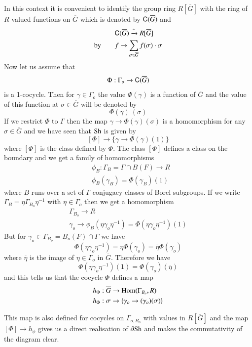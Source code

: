 In this context it is convenient to identify the group ring $R[\overline{G}]$ with the ring of $R$ valued functions on $\overline{G}$ which is denoted by $\mathsf{C}(\overline{G})$ and
\begin{align*}
& \mathsf{C}(\overline{G})\xrightarrow{\sim}R[\overline{G}]\\
\text{by}\qquad & f\to \sum\limits_{\sigma\in \overline{G}}f(\sigma)\cdot \sigma
\end{align*}
Now let us assume that
$$
\Phi :\Gamma_{o}\to \mathsf{C}(\overline{G})
$$
is a 1-cocycle. Then for $\gamma\in \Gamma_{o}$ the value $\Phi(\gamma)$ is a function of $\overline{G}$ and the value of this function at $\sigma\in \overline{G}$ will be denoted by
$$
\Phi(\gamma) \ (\sigma)
$$
If we restrict $\Phi$ to $\Gamma$ then the map $\gamma\to \Phi(\gamma)(\sigma)$ is a homomorphism for any\pageoriginale $\sigma\in\overline{G}$ and we have seen that $\mathrm{Sh}$ is given by
$$
[\Phi]\to \{\gamma\to \Phi(\gamma)(1)\}
$$
where $[\Phi]$ is the class defined by $\Phi$. The class $[\Phi]$ defines a class on the boundary and we get a family of homomorphisms
\begin{align*}
& \phi_{B}:\Gamma_{B}=\Gamma\cap B(F)\to R\\
& \phi_{B}(\gamma_{B})=\Phi(\gamma_{B})(1)
\end{align*}
where $B$ runs over a set of $\Gamma$ conjugacy classes of Borel subgroups. If we write $\Gamma_{B}=\eta\Gamma_{B_{o}}\eta^{-1}$ with $\eta\in \Gamma_{o}$ then we get a homomorphism
\begin{gather*}
\Gamma_{B_{o}}\to R\\
\gamma_{o}\to \phi_{B}(\eta\gamma_{o}\eta^{-1})=\Phi(\eta\gamma_{o}\eta^{-1})(1)
\end{gather*}
But for $\gamma_{o}\in \Gamma_{B_{o}}=B_{o}(F)\cap \Gamma$ we have
$$
\Phi(\eta\gamma_{o}\eta^{-1})=\eta\Phi(\gamma_{o})=\overline{\eta}\Phi(\gamma_{o})
$$
where $\overline{\eta}$ is the image of $\eta\in \Gamma_{o}$ in $\overline{G}$. Therefore we have
$$
\Phi(\eta\gamma_{o}\eta^{-1})(1)=\Phi(\gamma_{o})(\overline{\eta})
$$
and this tells us that the cocycle $\Phi$ defines a map
\begin{align*}
& h_{\Phi}:\overline{G}\to \operatorname{Hom}(\Gamma_{B_{o}},R)\\
& h_{\Phi}:\sigma\to \{\gamma_{o}\to (\gamma_{o})(\sigma)\}
\end{align*}

This map is also defined for cocycles on $\Gamma_{o,B_{o}}$ with values in $R[\overline{G}]$ and the map $[\Phi]\to h_{\phi}$ gives us a direct realisation of $\partial \mathrm{Sh}$ and makes the commutativity of the diagram clear.

